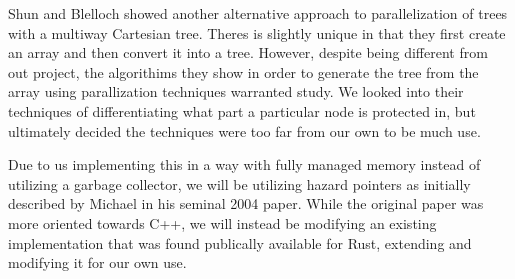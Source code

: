 \documentclass[conference]{IEEEtran}
\begin{document}
\par
Shun and Blelloch showed another alternative approach to parallelization of trees with a multiway Cartesian tree. Theres is slightly unique in that they first create an array and then convert it into a tree. However, despite being different from out project, the algorithims they show in order to generate the tree from the array using parallization techniques warranted study. We looked into their techniques of differentiating what part a particular node is protected in, but ultimately decided the techniques were too far from our own to be much use. \cite{Shun2014}
\par
Due to us implementing this in a way with fully managed memory instead of utilizing a garbage collector, we will be utilizing hazard pointers as initially described by Michael in his seminal 2004 paper. \cite{Michael2004} While the original paper was more oriented towards C++, we will instead be modifying an existing implementation that was found publically available for Rust, extending and modifying it for our own use. \cite{CHAMT}
\end{document}
